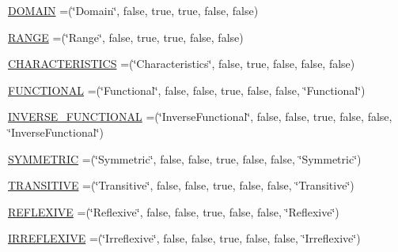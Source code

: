 \begin{DoxyCompactItemize}
\item 
\hyperlink{enumorg_1_1coode_1_1owlapi_1_1manchesterowlsyntax_1_1_manchester_o_w_l_syntax_a8c4a508d79291fcf6f596e399696fb58}{D\-O\-M\-A\-I\-N} =(\char`\"{}Domain\char`\"{}, false, true, true, false, false)
\item 
\hyperlink{enumorg_1_1coode_1_1owlapi_1_1manchesterowlsyntax_1_1_manchester_o_w_l_syntax_a8b0f3a52b380271c6c7b0ac3b7002e24}{R\-A\-N\-G\-E} =(\char`\"{}Range\char`\"{}, false, true, true, false, false)
\item 
\hyperlink{enumorg_1_1coode_1_1owlapi_1_1manchesterowlsyntax_1_1_manchester_o_w_l_syntax_a1bfc99baef5ca7c6f106ad7b5b811873}{C\-H\-A\-R\-A\-C\-T\-E\-R\-I\-S\-T\-I\-C\-S} =(\char`\"{}Characteristics\char`\"{}, false, true, false, false, false)
\item 
\hyperlink{enumorg_1_1coode_1_1owlapi_1_1manchesterowlsyntax_1_1_manchester_o_w_l_syntax_a5e88005c95520fe3a4f50e28fdc70f28}{F\-U\-N\-C\-T\-I\-O\-N\-A\-L} =(\char`\"{}Functional\char`\"{}, false, false, true, false, false, \char`\"{}Functional\char`\"{})
\item 
\hyperlink{enumorg_1_1coode_1_1owlapi_1_1manchesterowlsyntax_1_1_manchester_o_w_l_syntax_ad2282d37b5e9f0f4dd6bbcd6c1f51adc}{I\-N\-V\-E\-R\-S\-E\-\_\-\-F\-U\-N\-C\-T\-I\-O\-N\-A\-L} =(\char`\"{}Inverse\-Functional\char`\"{}, false, false, true, false, false, \char`\"{}Inverse\-Functional\char`\"{})
\item 
\hyperlink{enumorg_1_1coode_1_1owlapi_1_1manchesterowlsyntax_1_1_manchester_o_w_l_syntax_ac54b57260cb3e9f8a977b71cd72ebe49}{S\-Y\-M\-M\-E\-T\-R\-I\-C} =(\char`\"{}Symmetric\char`\"{}, false, false, true, false, false, \char`\"{}Symmetric\char`\"{})
\item 
\hyperlink{enumorg_1_1coode_1_1owlapi_1_1manchesterowlsyntax_1_1_manchester_o_w_l_syntax_acd6fb714704ad7e1bceaaafb763ca1f2}{T\-R\-A\-N\-S\-I\-T\-I\-V\-E} =(\char`\"{}Transitive\char`\"{}, false, false, true, false, false, \char`\"{}Transitive\char`\"{})
\item 
\hyperlink{enumorg_1_1coode_1_1owlapi_1_1manchesterowlsyntax_1_1_manchester_o_w_l_syntax_ad7aaa18610487ae9fc16f39602814598}{R\-E\-F\-L\-E\-X\-I\-V\-E} =(\char`\"{}Reflexive\char`\"{}, false, false, true, false, false, \char`\"{}Reflexive\char`\"{})
\item 
\hyperlink{enumorg_1_1coode_1_1owlapi_1_1manchesterowlsyntax_1_1_manchester_o_w_l_syntax_a3fa85d51e1a0a2bfa23b67c02c942018}{I\-R\-R\-E\-F\-L\-E\-X\-I\-V\-E} =(\char`\"{}Irreflexive\char`\"{}, false, false, true, false, false, \char`\"{}Irreflexive\char`\"{})

\end{DoxyCompactItemize}
